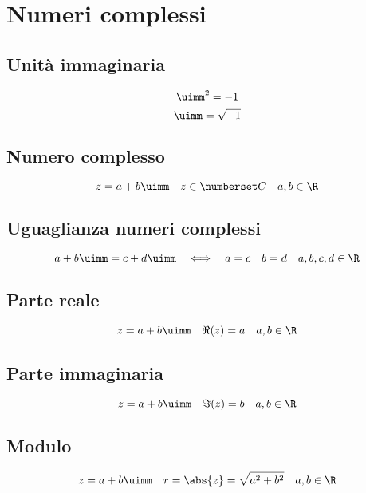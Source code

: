 \chapter{Numeri complessi}
\section{Unità immaginaria}
\begin{equation}
\uimm^2=-1
\end{equation}
\begin{equation}
\uimm=\sqrt{-1}
\end{equation}
\section{Numero complesso}
\begin{equation}
z=a+b\uimm\quad z\in\Co\quad a,b\in\R
\end{equation}
\section{Uguaglianza numeri complessi}
\begin{equation}
a+b\uimm=c+d\uimm\quad\Longleftrightarrow\quad a=c\quad b=d  \quad a,b,c,d\in\R
\end{equation}
\section{Parte reale}
\begin{equation}
z=a+b\uimm\quad\Re(z)=a\quad a,b\in\R
\end{equation}
\section{Parte immaginaria}
\begin{equation}
z=a+b\uimm\quad\Im(z)=b\quad a,b\in\R
\end{equation}
\section{Modulo}
\begin{equation}
z=a+b\uimm\quad r=\abs{z}=\sqrt{a^2+b^2}\quad a,b\in\R
\end{equation}
